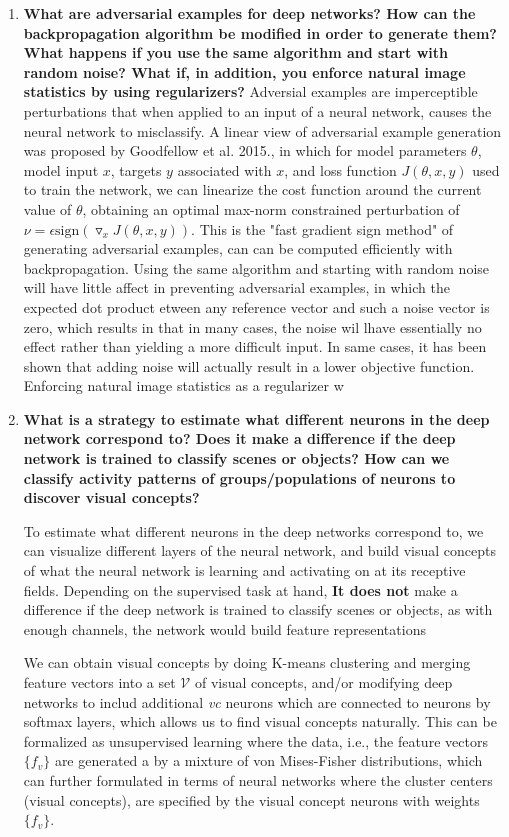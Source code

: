 \documentclass[10pt,onecolumn,letterpaper]{article}
\begin{document}
\begin{enumerate}

\item \textbf{What are adversarial examples for deep networks? How can the backpropagation algorithm be modified in order to generate them? What happens if you use the same algorithm and start with random noise? What if, in addition, you enforce natural image statistics by using regularizers?}
Adversial examples are imperceptible perturbations that when applied to an input of a neural network, causes the neural network to misclassify. A linear view of adversarial example generation was proposed by Goodfellow et al. 2015., in which for model parameters $\theta$, model input $x$, targets $y$ associated with $x$, and loss function $J(\theta, x, y)$ used to train the network, we can linearize the cost function around the current value of $\theta$, obtaining an optimal max-norm constrained perturbation of $\nu = \epsilon\text{sign}(\triangledown_xJ(\theta,x,y))$. This is the "fast gradient sign method" of generating adversarial examples, can can be computed efficiently with backpropagation. Using the same algorithm and starting with random noise will have little affect in preventing adversarial examples, in which the expected dot product etween any reference vector and such a noise vector is zero, which results in that in many cases, the noise wil lhave essentially no effect rather than yielding a more difficult input. In same cases, it has been shown that adding noise will actually result in a lower objective function. Enforcing natural image statistics as a regularizer w

\item \textbf{What is a strategy to estimate what different neurons in the deep network correspond to? Does it make a difference if the deep network is trained to classify scenes or objects? How can we classify activity patterns of groups/populations of neurons to discover visual concepts?}

To estimate what different neurons in the deep networks correspond to, we can visualize different layers of the neural network, and build visual concepts of what the neural network is learning and activating on at its receptive fields. Depending on the supervised task at hand, \textbf{It does not} make a difference if the deep network is trained to classify scenes or objects, as with enough channels, the network would build feature representations

We can obtain visual concepts by doing K-means clustering and merging feature vectors into a set $\mathcal{V}$ of visual concepts, and/or modifying deep networks to includ additional \textit{vc} neurons which are connected to neurons by softmax layers, which allows us to find visual concepts naturally. This can be formalized as unsupervised learning where the data, i.e., the feature vectors $\{f_v\}$ are generated a by a mixture of von Mises-Fisher distributions, which can further formulated in terms of neural networks where the cluster centers (visual concepts), are specified by the visual concept neurons with weights $\{f_v\}$.

\end{enumerate}
\end{document}
